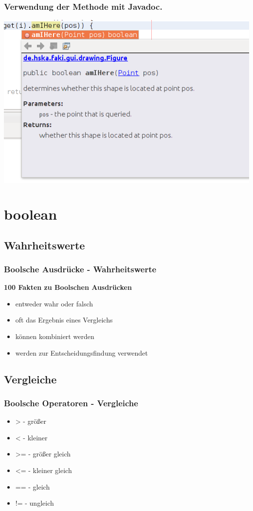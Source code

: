 \documentclass[final]{beamer}
\begin{document}
\begin{frame}
	\frametitle{Verwendung der Methode mit Javadoc.}
	\includegraphics[scale=0.5]{JavaDoc_example_2_1.png}
\end{frame}

\section{boolean}
\subsection{Wahrheitswerte}
\begin{frame}
	\frametitle{Boolsche Ausdrücke - Wahrheitswerte}
	\textbf{100 Fakten zu Boolschen Ausdrücken}
	\begin{itemize}
		\item{entweder wahr oder falsch}
		\item{oft das Ergebnis eines Vergleichs}
		\item{können kombiniert werden}
		\item{werden zur Entscheidungsfindung verwendet}
	\end{itemize}
\end{frame}


\subsection{Vergleiche}
\begin{frame}
	\frametitle{Boolsche Operatoren - Vergleiche}
	\begin{itemize}
		\item{>  - größer}
		\item{<  - kleiner}
		\item{>= - größer gleich}
		\item{<= - kleiner gleich}
		\item{== - gleich}
		\item{!= - ungleich}
	\end{itemize}
\end{frame}
\end{document}
